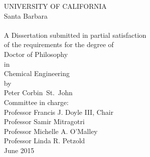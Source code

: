 \thispagestyle{empty}
\begin{center}
  UNIVERSITY OF CALIFORNIA\\
  Santa Barbara\\
  \vfil
  {\Large\thetitle}\\
  \vfil
  A Dissertation submitted in partial satisfaction\\
  of the requirements for the degree of\\
  \vfil
  Doctor of Philosophy\\
  in\\
  Chemical Engineering\\
  \vfil
  by\\
  \vfil
  {\large Peter Corbin\ St.\ John}\\
  \vfil
  Committee in charge:\\
  Professor Francis J. Doyle III, Chair\\
  Professor Samir Mitragotri\\
  Professor Michelle A. O'Malley\\
  Professor Linda R. Petzold\\
  \vfil
  June 2015
\end{center}

